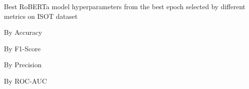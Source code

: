 \begin{table}[!htbp]
    \caption{Best RoBERTa model hyperparameters from the best epoch selected by different metrics on ISOT dataset}
    \label{tab:isot_roberta_hparams}
    \centering

    \begin{subtable}[t]{0.48\linewidth}
        \scriptsize
        \caption{By Accuracy}
        
    \end{subtable}
    \hfill
    \begin{subtable}[t]{0.48\linewidth}
        \scriptsize
        \caption{By F1-Score}
        
    \end{subtable}

    \vspace{1em}

    \begin{subtable}[t]{0.48\linewidth}
        \scriptsize
        \caption{By Precision}
        
    \end{subtable}
    \hfill
    \begin{subtable}[t]{0.48\linewidth}
        \scriptsize
        \caption{By ROC-AUC}
        
    \end{subtable}


\end{table}